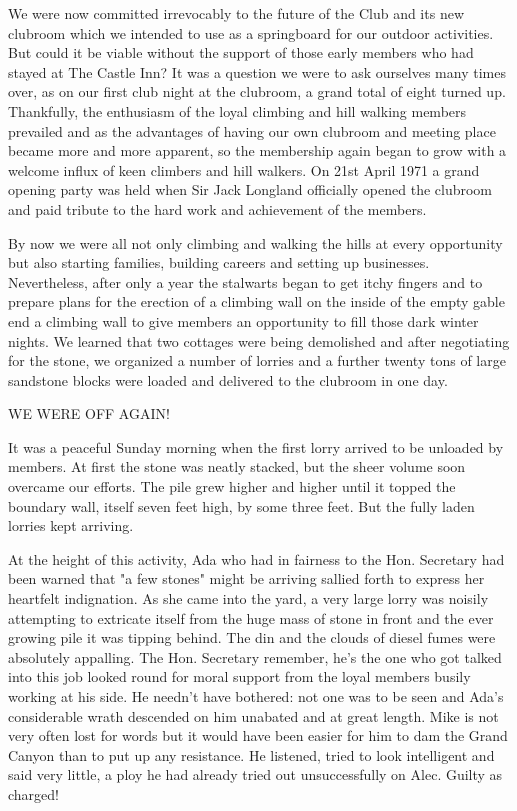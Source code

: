 \documentclass[a5paper,openany,font 10pt]{scrbook}
\begin{document}
We were now committed irrevocably to the future of the Club
and its new clubroom which we intended to use as a springboard
for our outdoor activities. But could it be viable without the
support of those early members who had stayed at The Castle Inn?
It was a question we were to ask ourselves many times over, as on
our first club night at the clubroom, a grand total of eight
turned up. Thankfully, the enthusiasm of the loyal climbing and
hill walking members prevailed and as the advantages of having
our own clubroom and meeting place became more and more apparent,
so the membership again began to grow with a welcome influx of
keen climbers and hill walkers. On 21st April 1971 a grand
opening party was held when Sir Jack Longland officially opened
the clubroom and paid tribute to the hard work and achievement of
the members.

By now we were all not only climbing and walking the hills
at every opportunity but also starting families, building careers
and setting up businesses. Nevertheless, after only a year the
stalwarts began to get itchy fingers and to prepare plans for the
erection of a climbing wall on the inside of the empty gable end
a climbing wall to give members an opportunity to fill those dark
winter nights. We learned that two cottages were being demolished
and after negotiating for the stone, we organized a number of
lorries and a further twenty tons of large sandstone blocks were
loaded and delivered to the clubroom in one day.

WE WERE OFF AGAIN!

It was a peaceful Sunday morning when the first lorry
arrived to be unloaded by members. At first the stone was neatly
stacked, but the sheer volume soon overcame our efforts. The pile
grew higher and higher until it topped the boundary wall, itself
seven feet high, by some three feet. But the fully laden lorries
kept arriving.

At the height of this activity, Ada  who had in fairness to
the Hon. Secretary had been warned that "a few stones" might be
arriving  sallied forth to express her heartfelt indignation. As
she came into the yard, a very large lorry was noisily attempting
to extricate itself from the huge mass of stone in front and the
ever growing pile it was tipping behind. The  din and the clouds
of diesel fumes were absolutely appalling. The Hon. Secretary
 remember, he's the one who got talked into this job  looked
round for moral support from the loyal members busily working at
his side. He needn't have bothered: not one was to be seen and
Ada's considerable wrath descended on him unabated and at great
length. Mike is not very often lost for words but it would have
been easier for him to dam the Grand Canyon than to put up any
resistance. He listened, tried to look intelligent and said very
little, a ploy he had already tried out unsuccessfully on Alec.
Guilty as charged!
\end{document}
